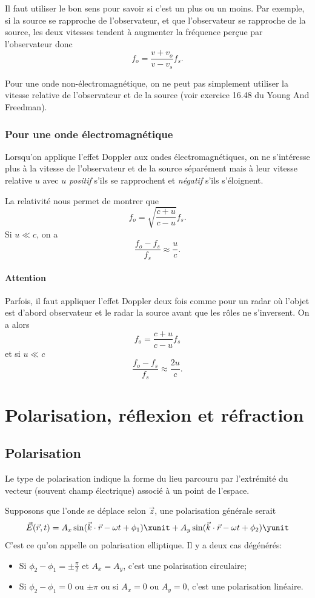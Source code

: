 Il faut utiliser le bon sens pour savoir si c'est un plus ou un moins.
Par exemple, si la source se rapproche de l'observateur, et que
l'observateur se rapproche de la source, les deux vitesses
tendent à augmenter la fréquence perçue par l'observateur donc
\[ f_o = \frac{v + v_o}{v - v_s} f_s. \]

\begin{myrem}
	Pour une onde non-électromagnétique, on ne peut pas simplement
	utiliser la vitesse relative de l'observateur et de la source
	(voir exercice 16.48 du Young And Freedman).
\end{myrem}

\subsubsection{Pour une onde électromagnétique}
Lorsqu'on applique l'effet Doppler aux ondes électromagnétiques,
on ne s'intéresse plus à la vitesse de l'observateur et de la source séparément
mais à leur vitesse relative $u$ avec $u$ \emph{positif} s'ils se rapprochent
et \emph{négatif} s'ils s'éloignent.

La relativité nous permet de montrer que
\[ f_o = \sqrt{\frac{c + u}{c - u}}f_s. \]
Si $u \ll c$, on a
\[ \frac{f_o - f_s}{f_s} \approx \frac{u}{c}. \]

\paragraph{Attention} Parfois, il faut appliquer l'effet Doppler deux fois
comme pour un radar où l'objet est d'abord observateur et le radar la source
avant que les rôles ne s'inversent.
On a alors
\[ f_o = \frac{c + u}{c - u}f_s \]
et si $u \ll c$
\[ \frac{f_o - f_s}{f_s} \approx \frac{2u}{c}. \]

\section{Polarisation, réflexion et réfraction}

\subsection{Polarisation}
Le type de polarisation indique la forme du lieu parcouru
par l'extrémité du vecteur (souvent champ électrique) associé à un
point de l'espace.

Supposons que l'onde se déplace selon $\vec{z}$,
une polarisation générale serait
\[ \vec{E}(\vec{r}, t) = A_x \sin(\vec{k}\cdot\vec{r} - \omega t + \phi_1)
  \xunit
+ A_y \sin(\vec{k} \cdot \vec{r} - \omega t + \phi_2) \yunit \]
C'est ce qu'on appelle on polarisation elliptique.
Il y a deux cas dégénérés:
\begin{itemize}
  \item Si $\phi_2-\phi_1 = \pm \frac{\pi}{2}$
    et $A_x = A_y$, c'est une polarisation circulaire;
  \item Si $\phi_2-\phi_1 = 0$ ou $\pm\pi$ ou si $A_x = 0$ ou $A_y = 0$,
    c'est une polarisation linéaire.
\end{itemize}

